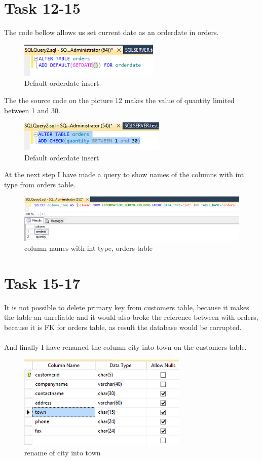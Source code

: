 \documentclass[english]{article}
\begin{document}
\section{Task 12-15}
The code bellow allows us set current date as an orderdate in orders.
\begin{figure}[H]
\centerline{\includegraphics[scale=0.8]{SQLCreateDB/defaultDate}}
\caption{Default orderdate insert}
\end{figure}
The the source code on the picture 12 makes the value of quantity limited between 1 and 30.
\begin{figure}[H]
\centerline{\includegraphics[scale=0.8]{SQLCreateDB/Alterquantity}}
\caption{Default orderdate insert}
\end{figure}
At the next step I have made a query to show names of the columns with int type from orders table.
\begin{figure}[H]
\centerline{\includegraphics[scale=0.8]{SQLCreateDB/intcolumn}}
\caption{column names with int type, orders table}
\end{figure}
\section{Task 15-17}
It is not possible to delete primary key from customers table, because it makes the table an unreliable and it would also broke the reference between with orders, because it is FK for orders table, as result the database would be corrupted.
\\\\
And finally I have renamed the column city into town on the customers table.
\begin{figure}[H]
\centerline{\includegraphics[scale=0.8]{SQLCreateDB/altercustomers}}
\caption{rename of city into town}
\end{figure}
\end{document}
